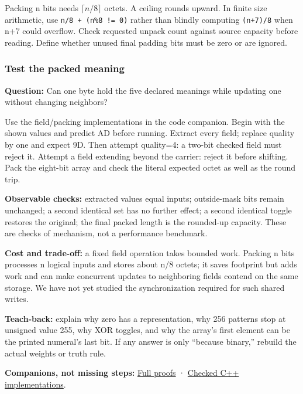 Packing n bits needs \(\lceil n/8\rceil\) octets. A ceiling rounds upward. In finite size arithmetic, use \texttt{n/8\ +\ (n\%8\ !=\ 0)} rather than blindly computing \texttt{(n+7)/8} when n+7 could overflow. Check requested unpack count against source capacity before reading. Define whether unused final padding bits must be zero or are ignored.

\subsubsection{Test the packed meaning}\label{01-foundations-i-ch001-test-the-packed-meaning}

\hypertarget{01-foundations-i-ch001-test-the-packed-meaning}{}

\textbf{Question:} Can one byte hold the five declared meanings while updating one without changing neighbors?

Use the field/packing implementations in the code companion. Begin with the shown values and predict AD before running. Extract every field; replace quality by one and expect 9D. Then attempt quality=4: a two-bit checked field must reject it. Attempt a field extending beyond the carrier: reject it before shifting. Pack the eight-bit array and check the literal expected octet as well as the round trip.

\textbf{Observable checks:} extracted values equal inputs; outside-mask bits remain unchanged; a second identical set has no further effect; a second identical toggle restores the original; the final packed length is the rounded-up capacity. These are checks of mechanism, not a performance benchmark.

\textbf{Cost and trade-off:} a fixed field operation takes bounded work. Packing n bits processes n logical inputs and stores about n/8 octets; it saves footprint but adds work and can make concurrent updates to neighboring fields contend on the same storage. We have not yet studied the synchronization required for such shared writes.

\textbf{Teach-back:} explain why zero has a representation, why 256 patterns stop at unsigned value 255, why XOR toggles, and why the array's first element can be the printed numeral's last bit. If any answer is only ``because binary,'' rebuild the actual weights or truth rule.

\textbf{Companions, not missing steps:} \hyperref[01-foundations-i-ch011-m001---positional-value-masks-fields-and-de-morgan]{Full proofs} · \hyperref[appendix-4e2236f53445-m001---width-safe-fields-and-lsb-first-bit-packing]{Checked C++ implementations}.

